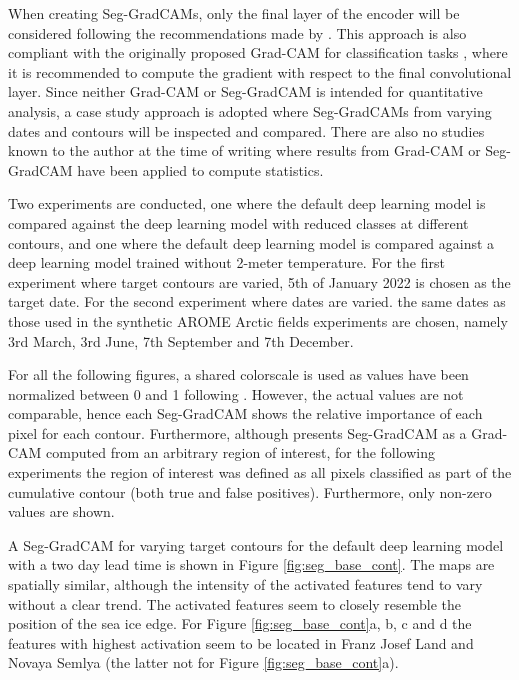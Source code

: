 \documentclass[../main/thesis.tex]{subfiles}
\begin{document}
When creating Seg-GradCAMs, only the final layer of the encoder will be considered following the recommendations made by \citet{Vinogradova2020}. This approach is also compliant with the originally proposed Grad-CAM for classification tasks \citep{Selvaraju2016}, where it is recommended to compute the gradient with respect to the final convolutional layer. Since neither Grad-CAM or Seg-GradCAM is intended for quantitative analysis, a case study approach is adopted where Seg-GradCAMs from varying dates and contours will be inspected and compared. There are also no studies known to the author at the time of writing where results from Grad-CAM or Seg-GradCAM have been applied to compute statistics.

Two experiments are conducted, one where the default deep learning model is compared against the deep learning model with reduced classes at different contours, and one where the default deep learning model is compared against a deep learning model trained without 2-meter temperature. For the first experiment where target contours are varied, 5th of January 2022 is chosen as the target date. For the second experiment where dates are varied. the same dates as those used in the synthetic AROME Arctic fields experiments are chosen, namely 3rd March, 3rd June, 7th September and 7th December. 

For all the following figures, a shared colorscale is used as values have been normalized between 0 and 1 following \citet{Vinogradova2020}. However, the actual values are not comparable, hence each Seg-GradCAM shows the relative importance of each pixel for each contour. Furthermore, although \citet{Vinogradova2020} presents Seg-GradCAM as a Grad-CAM computed from an arbitrary region of interest, for the following experiments the region of interest was defined as all pixels classified as part of the cumulative contour (both true and false positives). Furthermore, only non-zero values are shown.

A Seg-GradCAM for varying target contours for the default deep learning model with a two day lead time is shown in Figure \ref{fig:seg_base_cont}. The maps are spatially similar, although the intensity of the activated features tend to vary without a clear trend. The activated features seem to closely resemble the position of the sea ice edge. For Figure \ref{fig:seg_base_cont}a, b, c and d the features with highest activation seem to be located in Franz Josef Land and Novaya Semlya (the latter not for Figure \ref{fig:seg_base_cont}a). 
\end{document}
